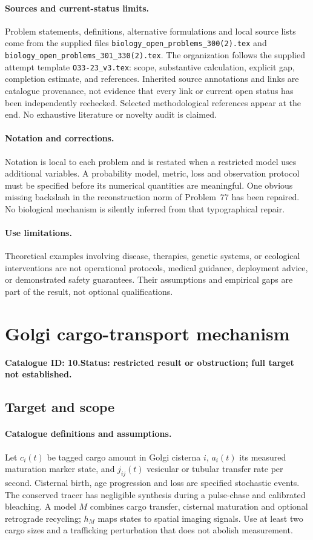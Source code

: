 \documentclass[11pt]{article}
\begin{document}
\paragraph{Sources and current-status limits.}
Problem statements, definitions, alternative formulations and local source lists
come from the supplied files
\texttt{biology\_open\_problems\_300(2).tex} and
\texttt{biology\_open\_problems\_301\_330(2).tex}.
The organization follows the supplied attempt template
\texttt{O33-23\_v3.tex}: scope, substantive calculation, explicit gap,
completion estimate, and references. Inherited source annotations and links are
catalogue provenance, not evidence that every link or current open status has
been independently rechecked. Selected methodological references appear at the
end. No exhaustive literature or novelty audit is claimed.

\paragraph{Notation and corrections.}
Notation is local to each problem and is restated when a restricted model uses
additional variables. A probability model, metric, loss and observation protocol
must be specified before its numerical quantities are meaningful. One obvious
missing backslash in the reconstruction norm of Problem~77 has been repaired.
No biological mechanism is silently inferred from that typographical repair.

\paragraph{Use limitations.}
Theoretical examples involving disease, therapies, genetic systems, or ecological
interventions are not operational protocols, medical guidance, deployment advice,
or demonstrated safety guarantees. Their assumptions and empirical gaps are part
of the result, not optional qualifications.

\setcounter{section}{9}
\section{Golgi cargo-transport mechanism}
\label{prob:010}
\noindent\textbf{Catalogue ID: 10.}\quad \textbf{Status: restricted result or obstruction; full target not established.}
\subsection{Target and scope}
\paragraph{Catalogue definitions and assumptions.}
Let $c_i(t)$ be tagged cargo amount in Golgi cisterna $i$, $a_i(t)$ its measured maturation marker state, and $j_{ij}(t)$ vesicular or tubular transfer rate per second. Cisternal birth, age progression and loss are specified stochastic events. The conserved tracer has negligible synthesis during a pulse-chase and calibrated bleaching. A model $M$ combines cargo transfer, cisternal maturation and optional retrograde recycling; $h_M$ maps states to spatial imaging signals. Use at least two cargo sizes and a trafficking perturbation that does not abolish measurement.
\end{document}
